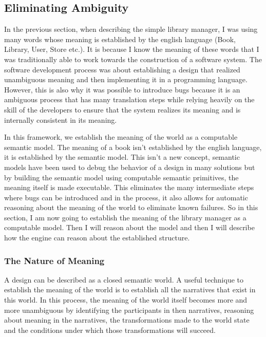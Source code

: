 \subsection{Eliminating Ambiguity}

In the previous section, when describing the simple library manager, I was using many words whose meaning is established by the english language (Book, Library, User, Store etc.). It is because I know the meaning of these words that I was traditionally able to work towards the construction of a software system. The software development process was about establishing a design that realized unambiguous meaning and then implementing it in a programming language. However, this is also why it was possible to introduce bugs because it is an ambiguous process that has many translation steps while relying heavily on the skill of the developers to ensure that the system realizes its meaning and is internally consistent in its meaning.

In this framework, we establish the meaning of the world as a computable semantic model. The meaning of a book isn't established by the english language, it is established by the semantic model. This isn't a new concept, semantic models have been used to debug the behavior of a design in many solutions but by building the semantic model using computable semantic primitives, the meaning itself is made executable. This eliminates the many intermediate steps where bugs can be introduced and in the process, it also allows for automatic reasoning about the meaning of the world to eliminate known failures. So in this section, I am now going to establish the meaning of the library manager as a computable model. Then I will reason about the model and then I will describe how the engine can reason about the established structure.

\subsubsection{The Nature of Meaning}

A design can be described as a closed semantic world. A useful technique to establish the meaning of the world is to establish all the narratives that exist in this world. In this process, the meaning of the world itself becomes more and more unambiguous by identifying the participants in then narratives, reasoning about meaning in the narratives, the transformations made to the world state and the conditions under which those transformations will succeed. 

